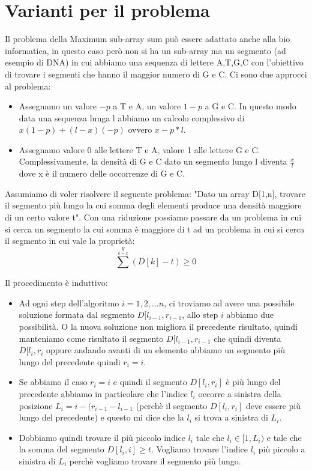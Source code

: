 \documentclass[14pt]{extreport}
\begin{document}
\section{Varianti per il problema}

Il problema della Maximum sub-array sum può essere adattato anche alla bio informatica, in questo caso però non si ha un sub-array ma un segmento (ad esempio di DNA) in cui abbiamo una sequenza di lettere A,T,G,C con l'obiettivo di trovare i segmenti che hanno il maggior numero di G e C.
Ci sono due approcci al problema:
\begin{itemize}
    \item Assegnamo un valore $-p$ a T e A, un valore $1-p$ a G e C. In questo modo data una sequenza lunga l abbiamo un calcolo complessivo di $x(1-p)+(l-x)(-p)$ ovvero $x-p*l$.
    \item Assegnamo valore 0 alle lettere T e A, valore 1 alle lettere G e C. Complessivamente, la densità di G e C dato un segmento lungo l diventa $\frac{x}{l}$ dove x è il numero delle occorrenze di G e C.
\end{itemize}

Assumiamo di voler risolvere il seguente problema:
\newline
"Dato un array D[1,n], trovare il segmento più lungo la cui somma degli elementi produce una densità maggiore di un certo valore t".
\newline
Con una riduzione possiamo passare da un problema in cui si cerca un segmento la cui somma è maggiore di t ad un problema in cui si cerca il segmento in cui vale la proprietà:
\begin{equation}
    \sum^y \limits_{k=x} (D[k]-t) \geq 0
\end{equation}

Il procedimento è induttivo:
\begin{itemize}
    \item Ad ogni step dell'algoritmo $i=1,2,...n$, ci troviamo ad avere una possibile soluzione formata dal segmento $D[l_{i-1}, r_{i-1}$, allo step $i$ abbiamo due possibilità. O la nuova soluzione non migliora il precedente risultato, quindi manteniamo come risultato il segmento $D[l_{i-1}, r_{i-1}$ che quindi diventa $D[l_{i}, r_{i}$ oppure andando avanti di un elemento abbiamo un segmento più lungo del precedente quindi $r_i = i$.
    \item Se abbiamo il caso $r_i = i$ e quindi il segmento $D[l_i, r_i]$ è più lungo del precedente abbiamo in particolare che l'indice $l_i$ occorre a sinistra della posizione $L_i = i - (r_{i-1} - l_{i-1}$ (perchè il segmento $D[l_i, r_i]$ deve essere più lungo del precedente) e questo mi dice che la $l_i$ si trova a sinistra di $L_i$.
    \item Dobbiamo quindi trovare il più piccolo indice $l_i$ tale che $l_i \in [1,L_i)$ e tale che la somma del segmento $D[l_i,i] \geq t$.
    Vogliamo trovare l'indice $l_i$ più piccolo a sinistra di $L_i$ perchè vogliamo trovare il segmento più lungo.
\end{itemize}
\end{document}
